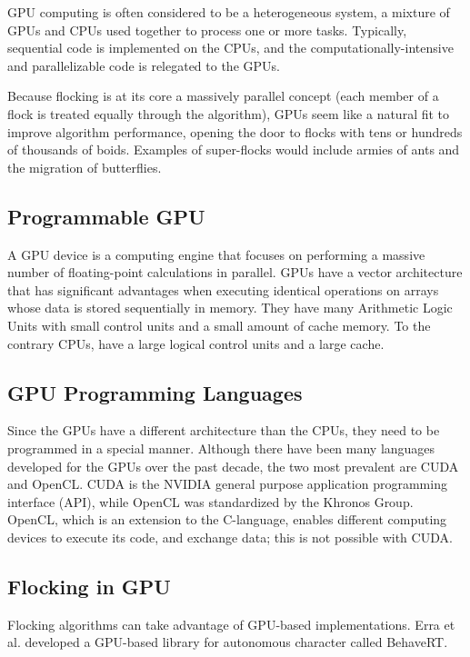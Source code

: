 GPU computing is often considered to be a heterogeneous system, a mixture of GPUs and CPUs used together to process one or more tasks. Typically, sequential code is implemented on the CPUs, and the computationally-intensive and parallelizable code is relegated to the GPUs.

Because flocking is at its core a massively parallel concept (each member of a flock is treated equally through the algorithm), GPUs seem like a natural fit to improve algorithm performance, opening the door to flocks with tens or hundreds of thousands of boids. Examples of super-flocks would include armies of ants and the migration of butterflies. 


\subsection{Programmable GPU}
A GPU device is a computing engine\cite{GPUbook} that focuses on performing a massive number of floating-point calculations in parallel. GPUs have a vector architecture that has significant advantages when executing identical operations on arrays whose data is stored sequentially in memory. They have many Arithmetic Logic Units with small control units and a small amount of cache memory. 
To the contrary CPUs, have a large logical control units and a large cache. 

\subsection{GPU Programming Languages}
Since the GPUs have a different architecture than the CPUs, they need to be programmed in a special manner. Although there have been many languages developed for the GPUs over the past decade, the two most prevalent are CUDA and OpenCL. CUDA is the NVIDIA  general purpose application programming interface (API)\cite{CUDAandOpenCL}, while OpenCL was standardized by the Khronos Group\cite{opencl}. OpenCL, which is an extension to the C-language,  enables different computing devices to execute its code, and exchange data; this is not 
possible with CUDA.
 
\subsection{Flocking in GPU}\label{flockingGPU}
Flocking algorithms can take advantage of GPU-based implementations. Erra et al.\cite{BehaveRT} developed a GPU-based library for autonomous character called BehaveRT.

